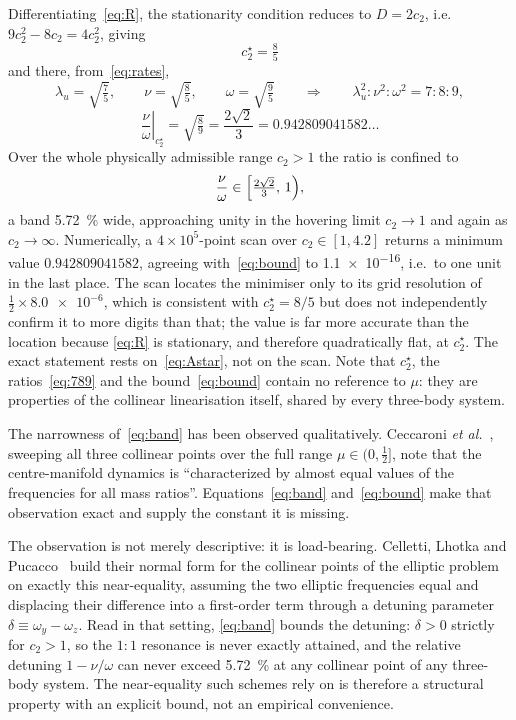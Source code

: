 \documentclass[11pt,a4paper]{article}
\begin{document}
Differentiating~\eqref{eq:R}, the stationarity condition reduces to $D=2c_2$,
i.e. $9c_2^{2}-8c_2=4c_2^{2}$, giving
\begin{equation}
  \boxed{\;c_2^\star = \tfrac{8}{5}\;}
  \label{eq:Astar}
\end{equation}
and there, from~\eqref{eq:rates},
\begin{equation}
  \lambda_u = \sqrt{\tfrac{7}{5}},\qquad
  \nu = \sqrt{\tfrac{8}{5}},\qquad
  \omega = \sqrt{\tfrac{9}{5}}
  \qquad\Longrightarrow\qquad
  \lambda_u^{2}:\nu^{2}:\omega^{2} = 7:8:9 ,
  \label{eq:789}
\end{equation}
\begin{equation}
  \left.\frac{\nu}{\omega}\right|_{c_2^\star} = \sqrt{\tfrac{8}{9}}
  = \frac{2\sqrt2}{3} = 0.942809041582\ldots
  \label{eq:bound}
\end{equation}
Over the whole physically admissible range $c_2>1$ the ratio is confined to
\begin{equation}
  \frac{\nu}{\omega} \in \Bigl[\tfrac{2\sqrt2}{3},\,1\Bigr) ,
  \label{eq:band}
\end{equation}
a band \SI{5.72}{\percent} wide, approaching unity in the hovering limit
$c_2\to1$ and again as $c_2\to\infty$. Numerically, a $4\times10^{5}$-point scan
over $c_2\in[1,4.2]$ returns a minimum value $0.942809041582$, agreeing
with~\eqref{eq:bound} to \num{1.1e-16}, i.e.\ to one unit in the last place.
The scan locates the minimiser only to its grid resolution of
$\tfrac12\times\num{8.0e-6}$, which is consistent with $c_2^\star=8/5$ but does
not independently confirm it to more digits than that; the value is far more
accurate than the location because \eqref{eq:R} is stationary, and therefore
quadratically flat, at $c_2^\star$. The exact statement rests
on~\eqref{eq:Astar}, not on the scan. Note that $c_2^\star$, the ratios~\eqref{eq:789} and the
bound~\eqref{eq:bound} contain no reference to $\mu$: they are properties of the
collinear linearisation itself, shared by every three-body system.

The narrowness of~\eqref{eq:band} has been observed qualitatively. Ceccaroni
\emph{et al.}~\cite{ceccaroni2016}, sweeping all three collinear points over the
full range $\mu\in(0,\tfrac12]$, note that the centre-manifold dynamics is
``characterized by almost equal values of the frequencies for all mass
ratios''. Equations~\eqref{eq:band} and~\eqref{eq:bound} make that observation
exact and supply the constant it is missing.

The observation is not merely descriptive: it is load-bearing. Celletti, Lhotka
and Pucacco~\cite{celletti2024} build their normal form for the collinear points
of the elliptic problem on exactly this near-equality, assuming the two elliptic
frequencies equal and displacing their difference into a first-order term
through a detuning parameter $\delta\equiv\omega_y-\omega_z$. Read in that
setting, \eqref{eq:band} bounds the detuning: $\delta>0$ strictly for $c_2>1$,
so the $1{:}1$ resonance is never exactly attained, and the relative detuning
$1-\nu/\omega$ can never exceed \SI{5.72}{\percent} at any collinear point of
any three-body system. The near-equality such schemes rely on is therefore a
structural property with an explicit bound, not an empirical convenience.
\end{document}
